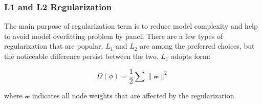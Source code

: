 \subsubsection{L1 and L2 Regularization}

The main purpose of regularization term is to reduce model complexity and help to avoid model overfitting problem by paneli There are a few types of regularization that are popular, $L_1$ and $L_2$ are among the preferred choices, but the noticeable difference persist between the two. $L_1$ adopts form:

\begin{equation}
   \Omega(\phi) = \frac {1}{2} \sum \parallel \mathcal{w} \parallel^2
\end{equation}

where $\mathcal{w}$ indicates all node weights that are affected by the regularization. 